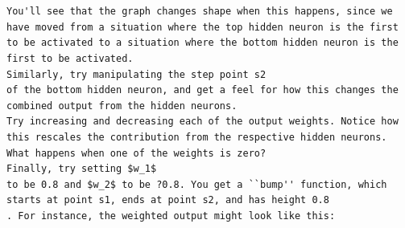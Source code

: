 \begin{lstlisting}


You'll see that the graph changes shape when this happens, since we have moved from a situation where the top hidden neuron is the first to be activated to a situation where the bottom hidden neuron is the first to be activated.
Similarly, try manipulating the step point s2
of the bottom hidden neuron, and get a feel for how this changes the combined output from the hidden neurons.
Try increasing and decreasing each of the output weights. Notice how this rescales the contribution from the respective hidden neurons. What happens when one of the weights is zero?
Finally, try setting $w_1$
to be 0.8 and $w_2$ to be ?0.8. You get a ``bump'' function, which starts at point s1, ends at point s2, and has height 0.8
. For instance, the weighted output might look like this:


\end{lstlisting}

